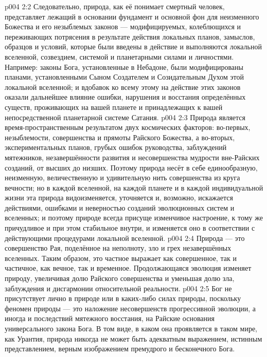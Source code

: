 \vs p004 2:2 Следовательно, природа, как её понимает смертный человек, представляет лежащий в основании фундамент и основной фон для неизменного Божества и его незыблемых законов --- модифицируемых, колеблющихся и переживающих потрясения в результате действия локальных планов, замыслов, образцов и условий, которые были введены в действие и выполняются локальной вселенной, созвездием, системой и планетарными силами и личностями. Например: законы Бога, установленные в Небадоне, были модифицированы планами, установленными Сыном Создателем и Созидательным Духом этой локальной вселенной; и вдобавок ко всему этому на действие этих законов оказали дальнейшее влияние ошибки, нарушения и восстания определённых существ, проживающих на вашей планете и принадлежащих к вашей непосредственной планетарной системе Сатания.
\vs p004 2:3 \pc Природа является время\hyp{}пространственным результатом двух космических факторов: во\hyp{}первых, незыблемости, совершенства и прямоты Райского Божества, а во\hyp{}вторых, экспериментальных планов, грубых ошибок руководства, заблуждений мятежников, незавершённости развития и несовершенства мудрости вне\hyp{}Райских созданий, от высших до низших. Поэтому природа несёт в себе единообразную, неизменную, величественную и удивительную нить совершенства из круга вечности; но в каждой вселенной, на каждой планете и в каждой индивидуальной жизни эта природа видоизменяется, уточняется и, возможно, искажается действиями, ошибками и неверностью созданий эволюционных систем и вселенных; и поэтому природе всегда присуще изменчивое настроение, к тому же причудливое и при этом стабильное внутри, и изменяется оно в соответствии с действующими процедурами локальной вселенной.
\vs p004 2:4 Природа --- это совершенство Рая, поделённое на неполноту, зло и грех незавершённых вселенных. Таким образом, это частное выражает как совершенное, так и частичное, как вечное, так и временное. Продолжающаяся эволюция изменяет природу, увеличивая долю Райского совершенства и уменьшая долю зла, заблуждения и дисгармонии относительной реальности.
\vs p004 2:5 \pc Бог не присутствует лично в природе или в каких\hyp{}либо силах природы, поскольку феномен природы --- это наложение несовершенств прогрессивной эволюции, а иногда и последствий мятежного восстания, на Райские основания универсального закона Бога. В том виде, в каком она проявляется в таком мире, как Урантия, природа никогда не может быть адекватным выражением, истинным представлением, верным изображением премудрого и бесконечного Бога.
